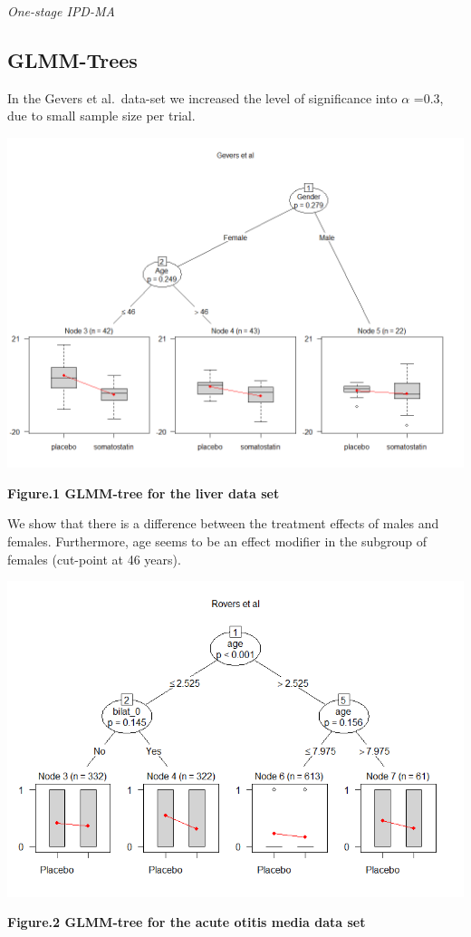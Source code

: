 \documentclass[14pt,]{article}
\begin{document}
\emph{One-stage IPD-MA}

\hypertarget{glmm-trees}{%
\subsection{GLMM-Trees}\label{glmm-trees}}

In the Gevers et al.~data-set we increased the level of significance
into \(\alpha\) =0.3, due to small sample size per trial.

\includegraphics[width=0.8\linewidth,height=0.8\textheight]{Figs/SomatostatinTree}

\textbf{Figure.1 GLMM-tree for the liver data set}

We show that there is a difference between the treatment effects of
males and females. Furthermore, age seems to be an effect modifier in
the subgroup of females (cut-point at 46 years).

\includegraphics[width=0.8\linewidth,height=0.8\textheight]{Figs/AOMTree}

\textbf{Figure.2 GLMM-tree for the acute otitis media data set}
\end{document}
